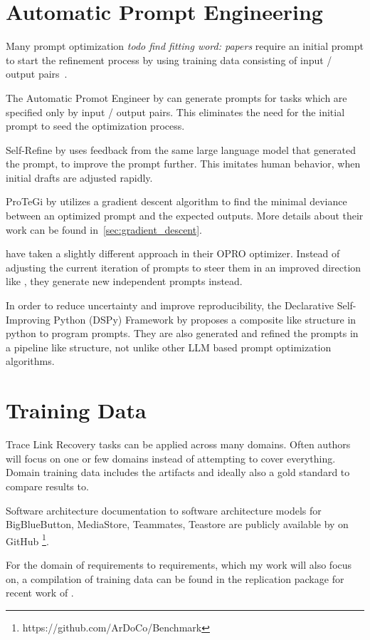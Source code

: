 \section{Automatic Prompt Engineering}
\label{related:sec:ape}
Many prompt optimization \textit{todo find fitting word: papers} require an initial prompt to start the refinement process by using training data consisting of input / output pairs~\cite{ramnath2025SystematicSurvey}.

The Automatic Promot Engineer by  can generate prompts for tasks which are specified only by input / output pairs. This eliminates the need for the initial prompt to seed the optimization process.

Self-Refine by  uses feedback from the same large language model that generated the prompt, to improve the prompt further. This imitates human behavior, when initial drafts are adjusted rapidly. 

ProTeGi by  utilizes a gradient descent algorithm to find the minimal deviance between an optimized prompt and the expected outputs. More details about their work can be found in~\ref{sec:gradient_descent}.

 have taken a slightly different approach in their OPRO optimizer. Instead of adjusting the current iteration of prompts to steer them in an improved direction like \citeauthor{pryzant2023AutomaticPrompt}, they generate new independent prompts instead.

In order to reduce uncertainty and improve reproducibility, the Declarative Self-Improving Python (DSPy) Framework by  proposes a composite like structure in python to program prompts. They are also generated and refined the prompts in a pipeline like structure, not unlike other LLM based prompt optimization algorithms. 

\section{Training Data}
Trace Link Recovery tasks can be applied across many domains. Often authors will focus on one or few domains instead of attempting to cover everything. Domain training data includes the artifacts and ideally also a gold standard to compare results to.

Software architecture documentation to software architecture models for BigBlueButton, MediaStore, Teammates, Teastore are publicly available by  on GitHub \footnote{https://github.com/ArDoCo/Benchmark}.

For the domain of requirements to requirements, which my work will also focus on, a compilation of training data can be found in the replication package\cite{hey2025ReplicationPackage} for recent work of \citeauthor{hey2025RequirementsTraceability}.